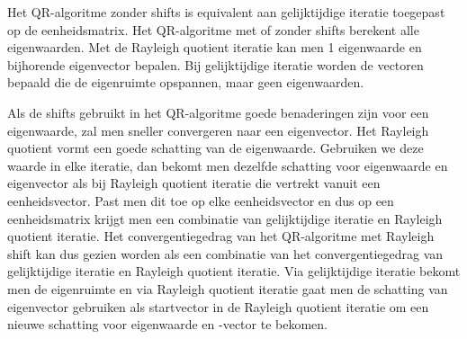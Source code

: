 Het QR-algoritme zonder shifts is equivalent aan gelijktijdige iteratie toegepast op de eenheidsmatrix.
Het QR-algoritme met of zonder shifts berekent alle eigenwaarden. Met de Rayleigh quotient iteratie kan men 1 eigenwaarde en bijhorende eigenvector bepalen. Bij gelijktijdige iteratie worden de vectoren bepaald die de eigenruimte opspannen, maar geen eigenwaarden.

Als de shifts gebruikt in het QR-algoritme goede benaderingen zijn voor een eigenwaarde, zal men sneller convergeren naar een eigenvector. Het Rayleigh quotient vormt een goede schatting van de eigenwaarde. Gebruiken we deze waarde in elke iteratie, dan bekomt men dezelfde schatting voor eigenwaarde en eigenvector als bij Rayleigh quotient iteratie die vertrekt vanuit een eenheidsvector. Past men dit toe op elke eenheidsvector en dus op een eenheidsmatrix krijgt men een combinatie van gelijktijdige iteratie en Rayleigh quotient iteratie.
Het convergentiegedrag van het QR-algoritme met Rayleigh shift kan dus gezien worden als een combinatie van het convergentiegedrag van gelijktijdige iteratie en Rayleigh quotient iteratie. Via gelijktijdige iteratie bekomt men de eigenruimte en via Rayleigh quotient iteratie gaat men de schatting van eigenvector gebruiken als startvector in de Rayleigh quotient iteratie om een nieuwe schatting voor eigenwaarde en -vector te bekomen.